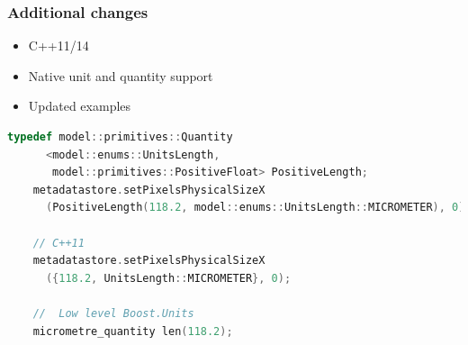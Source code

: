 \documentclass{beamer}
\begin{document}
\begin{frame}[fragile]
  \frametitle{Additional changes}

  \begin{itemize}
  \item C++11/14
  \item Native unit and quantity support
  \item Updated examples
  \end{itemize}
  \pause

  \begin{lstlisting}[language=C++]
    typedef model::primitives::Quantity
      <model::enums::UnitsLength,
       model::primitives::PositiveFloat> PositiveLength;
    metadatastore.setPixelsPhysicalSizeX
      (PositiveLength(118.2, model::enums::UnitsLength::MICROMETER), 0);

    // C++11
    metadatastore.setPixelsPhysicalSizeX
      ({118.2, UnitsLength::MICROMETER}, 0);

    //  Low level Boost.Units
    micrometre_quantity len(118.2);
  \end{lstlisting}
\end{frame}
\end{document}
